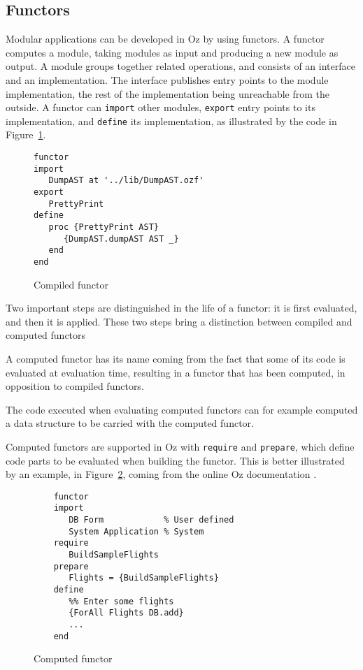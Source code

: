 \documentclass[a4paper]{memoir}
\begin{document}
\subsection{Functors}\label{sec:input:functors}
Modular applications can be developed in Oz by using functors. A functor
computes a module, taking modules as input and producing a new module as output.
A module groups together related operations, and consists of an interface and an implementation.
The interface publishes entry points to the module implementation, the rest of
the implementation being unreachable from the outside.
A functor can \lstinline!import! other modules, \lstinline!export! entry points to
its implementation, and \lstinline!define! its implementation, as illustrated by
the code in Figure~\ref{fig:compiled_functor}.
\begin{figure}[h]
\begin{lstlisting}
functor
import
   DumpAST at '../lib/DumpAST.ozf'
export
   PrettyPrint
define
   proc {PrettyPrint AST}
      {DumpAST.dumpAST AST _}
   end
end
\end{lstlisting}
\caption{Compiled functor}
\label{fig:compiled_functor}
\end{figure}

Two important steps are distinguished in the life of a functor: it is first
evaluated, and then it is applied.
These two steps bring a distinction between compiled and computed functors
\cite{Func}

A computed functor has its name coming from the fact that some of its code is evaluated
at evaluation time, resulting in a functor that has been computed, in opposition to
compiled functors.

The code executed when evaluating computed functors can for example computed a
data structure to be carried with the computed functor.


Computed functors are supported in Oz with
\lstinline!require! and \lstinline!prepare!, which define code parts to be evaluated when
building the functor. This is better illustrated by an example, in
Figure~\ref{fig:computed_functor}, coming from the online Oz
documentation \cite{Func}.

\begin{figure}[h]
\begin{lstlisting}
    functor 
    import 
       DB Form            % User defined
       System Application % System
    require
       BuildSampleFlights
    prepare 
       Flights = {BuildSampleFlights}
    define 
       %% Enter some flights
       {ForAll Flights DB.add}
       ... 
    end
\end{lstlisting}
\caption{Computed functor}
\label{fig:computed_functor}
\end{figure}
\end{document}
